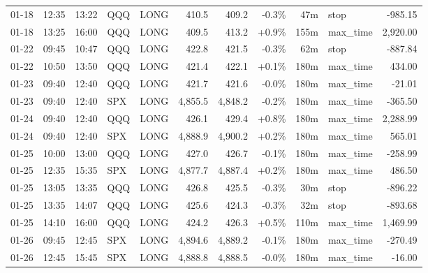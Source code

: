 \documentclass[11pt,a4paper,twoside]{article}
\begin{document}
\begin{center}
\begin{longtable}{>{\color{txtmain}}l l l l l r r r r >{\color{txtmain}}l r}
01-18 & 12:35 & 13:22 & QQQ & LONG & 410.5 & 409.2 & \textcolor{lossred}{-0.3\%} & 47m & stop & \textcolor{lossred}{-985.15} \\
01-18 & 13:25 & 16:00 & QQQ & LONG & 409.5 & 413.2 & \textcolor{wingreen}{+0.9\%} & 155m & max\_time & \textcolor{wingreen}{2,920.00} \\
01-22 & 09:45 & 10:47 & QQQ & LONG & 422.8 & 421.5 & \textcolor{lossred}{-0.3\%} & 62m & stop & \textcolor{lossred}{-887.84} \\
01-22 & 10:50 & 13:50 & QQQ & LONG & 421.4 & 422.1 & \textcolor{wingreen}{+0.1\%} & 180m & max\_time & \textcolor{wingreen}{434.00} \\
01-23 & 09:40 & 12:40 & QQQ & LONG & 421.7 & 421.6 & \textcolor{lossred}{-0.0\%} & 180m & max\_time & \textcolor{lossred}{-21.01} \\
01-23 & 09:40 & 12:40 & SPX & LONG & 4,855.5 & 4,848.2 & \textcolor{lossred}{-0.2\%} & 180m & max\_time & \textcolor{lossred}{-365.50} \\
01-24 & 09:40 & 12:40 & QQQ & LONG & 426.1 & 429.4 & \textcolor{wingreen}{+0.8\%} & 180m & max\_time & \textcolor{wingreen}{2,288.99} \\
01-24 & 09:40 & 12:40 & SPX & LONG & 4,888.9 & 4,900.2 & \textcolor{wingreen}{+0.2\%} & 180m & max\_time & \textcolor{wingreen}{565.01} \\
01-25 & 10:00 & 13:00 & QQQ & LONG & 427.0 & 426.7 & \textcolor{lossred}{-0.1\%} & 180m & max\_time & \textcolor{lossred}{-258.99} \\
01-25 & 12:35 & 15:35 & SPX & LONG & 4,877.7 & 4,887.4 & \textcolor{wingreen}{+0.2\%} & 180m & max\_time & \textcolor{wingreen}{486.50} \\
01-25 & 13:05 & 13:35 & QQQ & LONG & 426.8 & 425.5 & \textcolor{lossred}{-0.3\%} & 30m & stop & \textcolor{lossred}{-896.22} \\
01-25 & 13:35 & 14:07 & QQQ & LONG & 425.6 & 424.3 & \textcolor{lossred}{-0.3\%} & 32m & stop & \textcolor{lossred}{-893.68} \\
01-25 & 14:10 & 16:00 & QQQ & LONG & 424.2 & 426.3 & \textcolor{wingreen}{+0.5\%} & 110m & max\_time & \textcolor{wingreen}{1,469.99} \\
01-26 & 09:45 & 12:45 & SPX & LONG & 4,894.6 & 4,889.2 & \textcolor{lossred}{-0.1\%} & 180m & max\_time & \textcolor{lossred}{-270.49} \\
01-26 & 12:45 & 15:45 & SPX & LONG & 4,888.8 & 4,888.5 & \textcolor{lossred}{-0.0\%} & 180m & max\_time & \textcolor{lossred}{-16.00} \\

\end{longtable}
\end{center}
\end{document}
